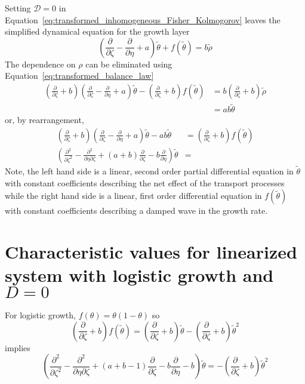 \documentclass[12pt]{amsart}
\begin{document}
Setting $\mathcal{D}=0$ in
Equation~\ref{eq:transformed_inhomogeneous_Fisher_Kolmogorov} leaves
the simplified dynamical equation for the growth layer
\begin{equation}
  \left(\frac{\partial}{\partial\zeta}-\frac{\partial}{\partial\eta}+a\right)\tilde{\theta}
  + f(\tilde{\theta}) = b\tilde{\rho}\label{eq:growth_alone}
\end{equation}
The dependence on $\rho$ can be eliminated using Equation~\ref{eq:transformed_balance_law}
\begin{align}
  \left(\frac{\partial}{\partial\zeta} + b\right)\left(
  \frac{\partial}{\partial\zeta}
  -\frac{\partial}{\partial\eta}+a\right)\tilde{\theta} -
  \left(\frac{\partial}{\partial\zeta} + b\right)f(\tilde{\theta}) &
  = b\left(\frac{\partial}{\partial\zeta} + b\right)\tilde{\rho} \\ &
  = ab\tilde{\theta}
  \label{eq:fixed_point_formulation}
\end{align}
or, by rearrangement,
\begin{align}
  \left(\frac{\partial}{\partial\zeta} + b\right)
  \left(\frac{\partial}{\partial\zeta}-\frac{\partial}{\partial\eta}+a\right)\tilde{\theta}
  -ab\tilde{\theta} & = \left(\frac{\partial}{\partial\zeta} + b\right)f(\tilde{\theta}) \\
    \left(
    \frac{\partial^2}{\partial\zeta^2} -
    \frac{\partial^2}{\partial\eta\partial\zeta} +
    (a+b)\frac{\partial}{\partial\zeta} -
    b\frac{\partial}{\partial\eta} 
  \right)\tilde{\theta} &=
\end{align}
Note, the left hand side is a linear, second order partial
differential equation in $\tilde{\theta}$ with constant coefficients
describing the net effect of the transport processes while the right
hand side is a linear, first order differential equation in
$f(\tilde{\theta})$ with constant coefficients describing a damped wave in the
growth rate.




\section{Characteristic values for linearized system with logistic growth and $D=0$}

For logistic growth, $f(\theta) = \theta(1-\theta)$ so
\begin{equation}
  \left(\frac{\partial}{\partial\zeta} + b\right)f(\tilde{\theta}) = 
  \left(\frac{\partial}{\partial\zeta} +b \right)\tilde{\theta} -
  \left(\frac{\partial}{\partial\zeta} + b\right)\tilde{\theta}^2
\end{equation}
implies
\begin{equation}
    \left(
    \frac{\partial^2}{\partial\zeta^2} -
    \frac{\partial^2}{\partial\eta\partial\zeta} +
    (a+b-1)\frac{\partial}{\partial\zeta} -
    b\frac{\partial}{\partial\eta}-b
  \right)\tilde{\theta} =  - \left(\frac{\partial}{\partial\zeta} + b\right)\tilde{\theta}^2
\end{equation}
\end{document}
